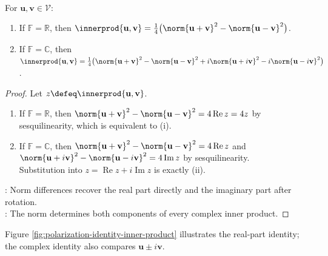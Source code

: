 \begin{theorem} \label{thm:polarization-identities} \\
For $\mathbf{u},\mathbf{v}\in\mathcal{V}$:
\begin{enumerate}[label=(\roman*)]
\setlength{\itemsep}{0pt}
\item If $\mathbb{F}=\mathbb{R}$, then $\innerprod{\mathbf{u},\mathbf{v}}=\frac{1}{4}\bigl(\norm{\mathbf{u}+\mathbf{v}}^2-\norm{\mathbf{u}-\mathbf{v}}^2\bigr)$.
\item If $\mathbb{F}=\mathbb{C}$, then $\innerprod{\mathbf{u},\mathbf{v}}=\frac{1}{4}\bigl(\norm{\mathbf{u}+\mathbf{v}}^2-\norm{\mathbf{u}-\mathbf{v}}^2+i\norm{\mathbf{u}+i\mathbf{v}}^2-i\norm{\mathbf{u}-i\mathbf{v}}^2\bigr)$.
\end{enumerate}
\begin{proof}
Let $z\defeq\innerprod{\mathbf{u},\mathbf{v}}$.
\begin{enumerate}[label=(\roman*)]
\setlength{\itemsep}{0pt}
\item If $\mathbb{F}=\mathbb{R}$, then $\norm{\mathbf{u}+\mathbf{v}}^2-\norm{\mathbf{u}-\mathbf{v}}^2=4\operatorname{Re}z=4z$ by sesquilinearity, which is equivalent to (i).
\item If $\mathbb{F}=\mathbb{C}$, then $\norm{\mathbf{u}+\mathbf{v}}^2-\norm{\mathbf{u}-\mathbf{v}}^2=4\operatorname{Re}z$ and $\norm{\mathbf{u}+i\mathbf{v}}^2-\norm{\mathbf{u}-i\mathbf{v}}^2=4\operatorname{Im}z$ by sesquilinearity.\\
Substitution into $z=\operatorname{Re}z+i\operatorname{Im}z$ is exactly (ii).
\end{enumerate}
: Norm differences recover the real part directly and the imaginary part after rotation.\\
: The norm determines both components of every complex inner product.
\end{proof}
\end{theorem}

\begin{illustrationfigure}[H]
  \centering
  
  \caption{The sum and difference vectors isolate $4\operatorname{Re}\innerprod{\mathbf{u},\mathbf{v}}$ through their squared-length difference.}
  \label{fig:polarization-identity-inner-product}
\end{illustrationfigure}

Figure \ref{fig:polarization-identity-inner-product} illustrates the real-part identity; the complex identity also compares $\mathbf{u}\pm i\mathbf{v}$.

